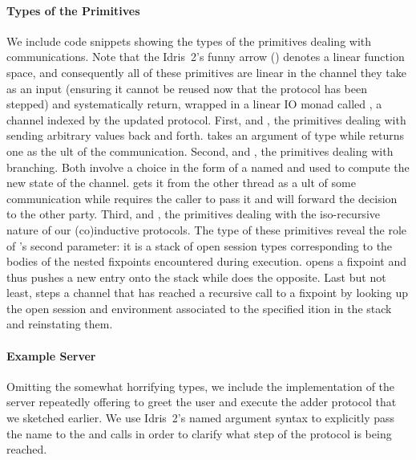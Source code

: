 \documentclass{easychair}
\begin{document}
\paragraph{Types of the Primitives} We include code snippets showing the
types of the primitives dealing with communications. Note that the Idris~2's
funny arrow () denotes a linear function space, and
consequently all of these primitives are linear in the channel
they take as an input (ensuring it cannot be reused now that the protocol
has been stepped) and systematically return, wrapped in a linear IO
monad called , a channel indexed by the updated protocol.
%
First,  and , the primitives
dealing with sending arbitrary values back and forth.
 takes an argument of type  while
 returns one as the ult of the
communication.
%
%
Second,  and , the primitives
dealing with branching.
%
Both involve a choice in the form of a  named 
and used to compute the new state of the channel.
%
 gets it from the other thread as a ult
of some communication while  requires the caller to
pass it and will forward the decision to the other party.
%
%
Third,  and , the
primitives dealing with the iso-recursive nature of our
(co)inductive protocols.
%
The type of these primitives reveal the role of 's
second parameter: it is a stack of open session types corresponding
to the bodies of the nested fixpoints encountered during execution.
%
 opens a fixpoint and thus pushes a new entry onto the
stack  while  does the opposite.
%
Last but not least,  steps a channel that has
reached a recursive call to a fixpoint by looking up the
open session and environment associated to the specified
ition in the stack and reinstating them.

\paragraph{Example Server} Omitting the somewhat horrifying types,
we include the implementation of the server repeatedly offering
to greet the user and execute the adder protocol that we sketched
earlier.
%
We use Idris~2's named argument syntax to explicitly pass the name
 to the  and 
calls in order to clarify what step of the protocol is being reached.
\end{document}
